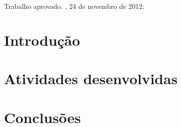 \documentclass[12pt, a4paper, chapter=TITLE, brazil, twoside, sumario=abnt-6027-2012]{abntex2}
\begin{document}
    \pretextual
        \imprimircapa
        \imprimirfolhaderosto[]
        
        \begin{folhadeaprovacao}
            \begin{center}
                {\ABNTEXchapterfont\large\imprimirautor}
                \vspace*{\fill}\vspace*{\fill}
                \begin{center}
                    \ABNTEXchapterfont\bfseries\Large\imprimirtitulo
                \end{center}
                \vspace*{\fill}
                \hspace{.45\textwidth}
                \begin{minipage}{.5\textwidth}
                    \imprimirpreambulo
                \end{minipage}%
                \vspace*{\fill}
            \end{center}
            Trabalho aprovado. \imprimirlocal, 24 de novembro de 2012:
            \begin{center}
                \vspace*{0.5cm}
                {\large\imprimirlocal}
                \par
                {\large\imprimirdata}
                \vspace*{1cm}
            \end{center}
        \end{folhadeaprovacao}
   
\tableofcontents

\textual
    \chapter{Introdução}
    \chapter{Atividades desenvolvidas}
    \chapter{Conclusões}
    
    
    
\end{document}
